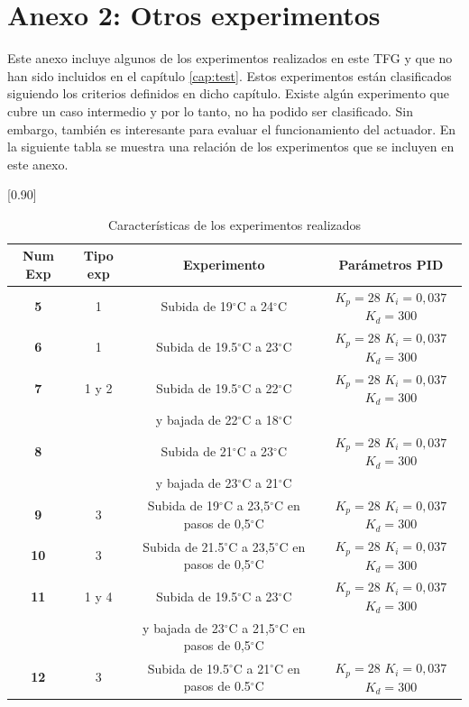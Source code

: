 \section{Anexo 2: Otros experimentos}\label{Anexo:experimentos}

	Este anexo incluye algunos de los experimentos realizados en este TFG y que no han sido incluidos en el capítulo \ref{cap:test}. Estos experimentos están clasificados siguiendo los criterios definidos en dicho capítulo. Existe algún experimento que cubre un caso intermedio y por lo tanto, no ha podido ser clasificado. Sin embargo, también es interesante para evaluar el funcionamiento del actuador. En la siguiente tabla se muestra una relación de los experimentos que se incluyen en este anexo.

\begin{table}[h]
\centering
\scalebox{0.80}[0.90]{
	\begin{tabular}{| c | c | c | c |}
		\hline
		\textbf{Num Exp} & \textbf{Tipo exp} &\textbf{Experimento}  & \textbf{Parámetros PID}\\
		\hline 
			\textbf{5} & 1 &Subida de 19{$^\circ$}C a 24{$^\circ$}C  & $K_{p}=28$ $K_{i}=0,037$  $ K_{d}=300$\\
		\hline
			\textbf{6} & 1 &Subida de 19.5{$^\circ$}C a 23{$^\circ$}C  & $K_{p}=28$ $K_{i}=0,037$  $ K_{d}=300$ \\
		\hline
			\textbf{7} & 1 y 2 & Subida de 19.5{$^\circ$}C a 22{$^\circ$}C & $K_{p}=28$ $K_{i}=0,037$  $ K_{d}=300$\\
				       &          & y bajada de 22{$^\circ$}C a 18{$^\circ$}C & \\
		\hline
			\textbf{8} &  &  Subida de 21{$^\circ$}C a 23{$^\circ$}C  & $K_{p}=28$ $K_{i}=0,037$  $ K_{d}=300$\\
				       &  & y bajada de 23{$^\circ$}C a 21{$^\circ$}C & \\
		\hline	
			\textbf{9} & 3 & Subida de 19{$^\circ$}C a 23,5{$^\circ$}C en pasos de  0,5{$^\circ$}C & $K_{p}=28$ $K_{i}=0,037$  $ K_{d}=300$\\
		\hline
			\textbf{10} & 3 & Subida de 21.5{$^\circ$}C a 23,5{$^\circ$}C en pasos de  0,5{$^\circ$}C  & $K_{p}=28$ $K_{i}=0,037$  $ K_{d}=300$ \\
		\hline
			\textbf{11} & 1 y 4 &  Subida de 19.5{$^\circ$}C a 23{$^\circ$}C & $K_{p}=28$ $K_{i}=0,037$  $ K_{d}=300$\\
				         &          &  y bajada de 23{$^\circ$}C a 21,5{$^\circ$}C en pasos de 0,5{$^\circ$}C & \\
		\hline
			\textbf{12} & 3 & Subida de 19.5{$^\circ$}C a 21{$^\circ$}C en pasos de 0.5{$^\circ$}C& $K_{p}=28$ $K_{i}=0,037$  $ K_{d}=300$\\
		\hline	
\end{tabular}}
\label{tablaA2_1:pruebas}\caption{Características de los experimentos realizados}
 \end{table}

